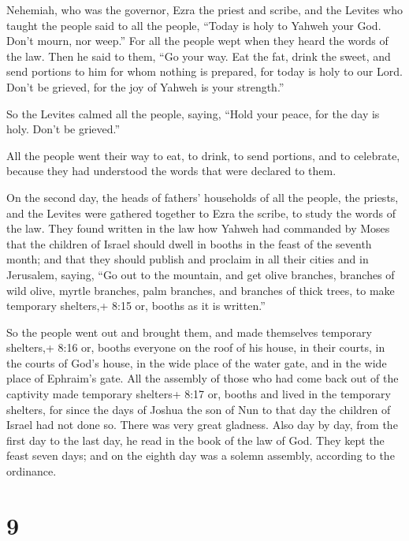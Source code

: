  Nehemiah, who was the governor, Ezra the priest and scribe,
and the Levites who taught the people said to all the people, ``Today is
holy to Yahweh your God. Don't mourn, nor weep.'' For all the people
wept when they heard the words of the law.  Then he said to
them, ``Go your way. Eat the fat, drink the sweet, and send portions to
him for whom nothing is prepared, for today is holy to our Lord. Don't
be grieved, for the joy of Yahweh is your strength.''

 So the Levites calmed all the people, saying, ``Hold your
peace, for the day is holy. Don't be grieved.''

 All the people went their way to eat, to drink, to send
portions, and to celebrate, because they had understood the words that
were declared to them.

 On the second day, the heads of fathers' households of all
the people, the priests, and the Levites were gathered together to Ezra
the scribe, to study the words of the law.  They found
written in the law how Yahweh had commanded by Moses that the children
of Israel should dwell in booths in the feast of the seventh month;
 and that they should publish and proclaim in all their
cities and in Jerusalem, saying, ``Go out to the mountain, and get olive
branches, branches of wild olive, myrtle branches, palm branches, and
branches of thick trees, to make temporary shelters,+ 8:15 or, booths as
it is written.''

 So the people went out and brought them, and made
themselves temporary shelters,+ 8:16 or, booths everyone on the roof of
his house, in their courts, in the courts of God's house, in the wide
place of the water gate, and in the wide place of Ephraim's gate.
 All the assembly of those who had come back out of the
captivity made temporary shelters+ 8:17 or, booths and lived in the
temporary shelters, for since the days of Joshua the son of Nun to that
day the children of Israel had not done so. There was very great
gladness.  Also day by day, from the first day to the last
day, he read in the book of the law of God. They kept the feast seven
days; and on the eighth day was a solemn assembly, according to the
ordinance.

\hypertarget{section-8}{%
\section{9}\label{section-8}}

